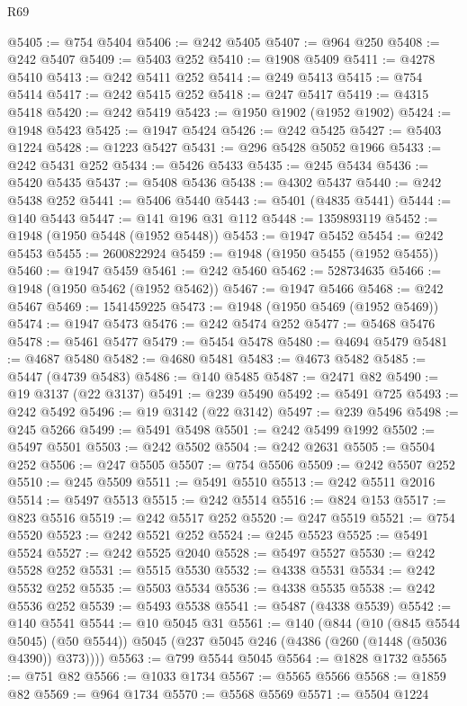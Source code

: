 \begin{lexlean}{R69}
\begin{coremodule}
{@5405 := @754 @5404
@5406 := @242 @5405
@5407 := @964 @250
@5408 := @242 @5407
@5409 := @5403 @252
@5410 := @1908 @5409
@5411 := @4278 @5410
@5413 := @242 @5411 @252
@5414 := @249 @5413
@5415 := @754 @5414
@5417 := @242 @5415 @252
@5418 := @247 @5417
@5419 := @4315 @5418
@5420 := @242 @5419
@5423 := @1950 @1902 (@1952 @1902)
@5424 := @1948 @5423
@5425 := @1947 @5424
@5426 := @242 @5425
@5427 := @5403 @1224
@5428 := @1223 @5427
@5431 := @296 @5428 @5052 @1966
@5433 := @242 @5431 @252
@5434 := @5426 @5433
@5435 := @245 @5434
@5436 := @5420 @5435
@5437 := @5408 @5436
@5438 := @4302 @5437
@5440 := @242 @5438 @252
@5441 := @5406 @5440
@5443 := @5401 (@4835 @5441)
@5444 := @140 @5443
@5447 := @141 @196 @31 @112
@5448 := 1359893119
@5452 := @1948 (@1950 @5448 (@1952 @5448))
@5453 := @1947 @5452
@5454 := @242 @5453
@5455 := 2600822924
@5459 := @1948 (@1950 @5455 (@1952 @5455))
@5460 := @1947 @5459
@5461 := @242 @5460
@5462 := 528734635
@5466 := @1948 (@1950 @5462 (@1952 @5462))
@5467 := @1947 @5466
@5468 := @242 @5467
@5469 := 1541459225
@5473 := @1948 (@1950 @5469 (@1952 @5469))
@5474 := @1947 @5473
@5476 := @242 @5474 @252
@5477 := @5468 @5476
@5478 := @5461 @5477
@5479 := @5454 @5478
@5480 := @4694 @5479
@5481 := @4687 @5480
@5482 := @4680 @5481
@5483 := @4673 @5482
@5485 := @5447 (@4739 @5483)
@5486 := @140 @5485
@5487 := @2471 @82
@5490 := @19 @3137 (@22 @3137)
@5491 := @239 @5490
@5492 := @5491 @725
@5493 := @242 @5492
@5496 := @19 @3142 (@22 @3142)
@5497 := @239 @5496
@5498 := @245 @5266
@5499 := @5491 @5498
@5501 := @242 @5499 @1992
@5502 := @5497 @5501
@5503 := @242 @5502
@5504 := @242 @2631
@5505 := @5504 @252
@5506 := @247 @5505
@5507 := @754 @5506
@5509 := @242 @5507 @252
@5510 := @245 @5509
@5511 := @5491 @5510
@5513 := @242 @5511 @2016
@5514 := @5497 @5513
@5515 := @242 @5514
@5516 := @824 @153
@5517 := @823 @5516
@5519 := @242 @5517 @252
@5520 := @247 @5519
@5521 := @754 @5520
@5523 := @242 @5521 @252
@5524 := @245 @5523
@5525 := @5491 @5524
@5527 := @242 @5525 @2040
@5528 := @5497 @5527
@5530 := @242 @5528 @252
@5531 := @5515 @5530
@5532 := @4338 @5531
@5534 := @242 @5532 @252
@5535 := @5503 @5534
@5536 := @4338 @5535
@5538 := @242 @5536 @252
@5539 := @5493 @5538
@5541 := @5487 (@4338 @5539)
@5542 := @140 @5541
@5544 := @10 @5045 @31
@5561 := @140
    (@844
      (@10 (@845 @5544 @5045) (@50 @5544))
      @5045
      (@237 @5045 @246 (@4386 (@260 (@1448 (@5036 @4390)) @373))))
@5563 := @799 @5544 @5045
@5564 := @1828 @1732
@5565 := @751 @82
@5566 := @1033 @1734
@5567 := @5565 @5566
@5568 := @1859 @82
@5569 := @964 @1734
@5570 := @5568 @5569
@5571 := @5504 @1224
}
\end{coremodule}
\end{lexlean}
